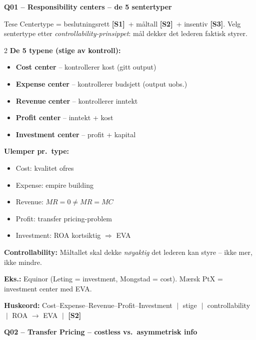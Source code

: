 \documentclass[10pt, a4paper]{article}
\newcommand{\SOne}{\textcolor{s1color}{\textbf{[S1]}}}
\newcommand{\STwo}{\textcolor{s2color}{\textbf{[S2]}}}
\newcommand{\SThree}{\textcolor{s3color}{\textbf{[S3]}}}
\newcommand{\qhead}[2]{%
  \noindent
  \begin{tcolorbox}[colback=boxborder, colframe=boxborder, arc=2pt, left=6pt, right=6pt, top=2pt, bottom=2pt]
    \color{white}\textbf{\large Q#1 -- #2}
  \end{tcolorbox}
}
\newcommand{\huskeord}[1]{%
  \vspace{2pt}
  \begin{tcolorbox}[colback=yellow!15, colframe=orange!70!black, boxrule=0.4pt, arc=2pt, left=4pt, right=4pt, top=2pt, bottom=2pt]
    \footnotesize\textbf{Huskeord:} #1
  \end{tcolorbox}
}
\begin{document}
\qhead{01}{Responsibility centers -- de 5 sentertyper}

\begin{keybox}{Tese}
Centertype = beslutningsrett \SOne\ + måltall \STwo\ + insentiv \SThree. Velg sentertype etter \emph{controllability-prinsippet}: mål dekker det lederen faktisk styrer.
\end{keybox}

\begin{multicols}{2}
\textbf{De 5 typene (stige av kontroll):}
\begin{itemize}
  \item \textbf{Cost center} -- kontrollerer kost (gitt output)
  \item \textbf{Expense center} -- kontrollerer budsjett (output uobs.)
  \item \textbf{Revenue center} -- kontrollerer inntekt
  \item \textbf{Profit center} -- inntekt + kost
  \item \textbf{Investment center} -- profit + kapital
\end{itemize}

\columnbreak

\textbf{Ulemper pr.\ type:}
\begin{itemize}
  \item Cost: kvalitet ofres
  \item Expense: empire building
  \item Revenue: $MR=0 \neq MR=MC$
  \item Profit: transfer pricing-problem
  \item Investment: ROA kortsiktig $\Rightarrow$ EVA
\end{itemize}
\end{multicols}

\begin{formulabox}
\textbf{Controllability:} Måltallet skal dekke \emph{nøyaktig} det lederen kan styre -- ikke mer, ikke mindre.
\end{formulabox}

\textbf{Eks.:} Equinor (Leting = investment, Mongstad = cost). Mærsk PtX = investment center med EVA.

\huskeord{Cost--Expense--Revenue--Profit--Investment $\;\big|\;$ stige $\;\big|\;$ controllability $\;\big|\;$ ROA $\to$ EVA $\;\big|\;$ \STwo}

\vfill\newpage

\qhead{02}{Transfer Pricing -- costless vs.\ asymmetrisk info}
\end{document}
